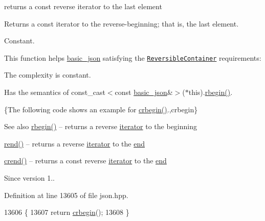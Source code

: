returns a const reverse iterator to the last element 

Returns a const iterator to the reverse-\/beginning; that is, the last element.

  Constant.

This function helps {\ttfamily \hyperlink{classnlohmann_1_1basic__json}{basic\+\_\+json}} satisfying the \href{http://en.cppreference.com/w/cpp/concept/ReversibleContainer}{\tt Reversible\+Container} requirements\+:
\begin{DoxyItemize}
\item The complexity is constant.
\item Has the semantics of {\ttfamily const\+\_\+cast$<$const \hyperlink{classnlohmann_1_1basic__json}{basic\+\_\+json}\&$>$($\ast$this).\hyperlink{classnlohmann_1_1basic__json_a1ef93e2006dbe52667294f5ef38b0b10}{rbegin()}}.
\end{DoxyItemize}

\{The following code shows an example for {\ttfamily \hyperlink{classnlohmann_1_1basic__json_a1e0769d22d54573f294da0e5c6abc9de}{crbegin()}}.,crbegin\}

\begin{DoxySeeAlso}{See also}
\hyperlink{classnlohmann_1_1basic__json_a1ef93e2006dbe52667294f5ef38b0b10}{rbegin()} -- returns a reverse \hyperlink{classnlohmann_1_1basic__json_a099316232c76c034030a38faa6e34dca}{iterator} to the beginning 

\hyperlink{classnlohmann_1_1basic__json_ac77aed0925d447744676725ab0b6d535}{rend()} -- returns a reverse \hyperlink{classnlohmann_1_1basic__json_a099316232c76c034030a38faa6e34dca}{iterator} to the \hyperlink{classnlohmann_1_1basic__json_a13e032a02a7fd8a93fdddc2fcbc4763c}{end} 

\hyperlink{classnlohmann_1_1basic__json_a5795b029dbf28e0cb2c7a439ec5d0a88}{crend()} -- returns a const reverse \hyperlink{classnlohmann_1_1basic__json_a099316232c76c034030a38faa6e34dca}{iterator} to the \hyperlink{classnlohmann_1_1basic__json_a13e032a02a7fd8a93fdddc2fcbc4763c}{end}
\end{DoxySeeAlso}
\begin{DoxySince}{Since}
version 1.. 
\end{DoxySince}


Definition at line 13605 of file json.\+hpp.


\begin{DoxyCode}
13606     \{
13607         \textcolor{keywordflow}{return} \hyperlink{classnlohmann_1_1basic__json_a1e0769d22d54573f294da0e5c6abc9de}{crbegin}();
13608     \}
\end{DoxyCode}
\mbox{\label{classnlohmann_1_1basic__json_ac77aed0925d447744676725ab0b6d535}} 
